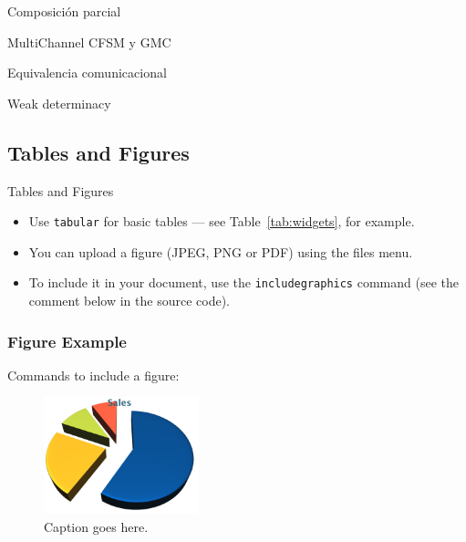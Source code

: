 \documentclass[10pt,xcolor={table,dvipsnames},t]{beamer}
\begin{document}
\begin{frame}{Composición parcial}
    
\end{frame}

\begin{frame}{MultiChannel CFSM y GMC}
    
\end{frame}

\begin{frame}{Equivalencia comunicacional}
    
\end{frame}

\begin{frame}{Weak determinacy}
    
\end{frame}

\subsection{Tables and Figures}

\begin{frame}{Tables and Figures}

\begin{itemize}
\item Use \texttt{tabular} for basic tables --- see Table~\ref{tab:widgets}, for example.
\item You can upload a figure (JPEG, PNG or PDF) using the files menu. 
\item To include it in your document, use the \texttt{includegraphics} command (see the comment below in the source code).
\end{itemize}

\end{frame}

\begin{frame}
\frametitle{Figure Example}

Commands to include a figure:

\begin{figure}
\includegraphics[width=0.4\textwidth]{chart}
\caption{\label{fig:your-figure}Caption goes here.}
\end{figure}
\end{frame}
\end{document}
